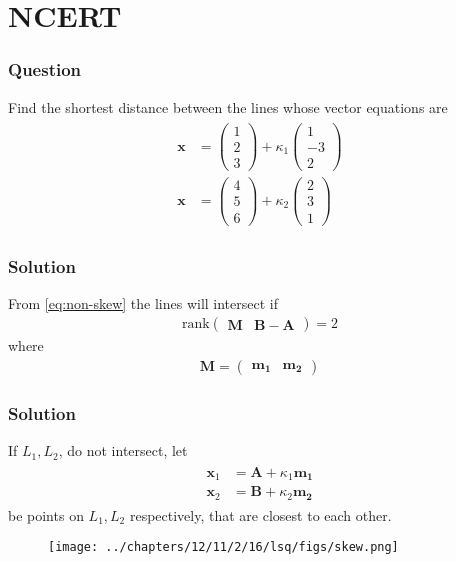 \documentclass{beamer}
\providecommand{\rank}{\text{rank}}
\theoremstyle{remark}
\newcommand{\myvec}[1]{\ensuremath{\begin{pmatrix}#1\end{pmatrix}}}
\let\vec\mathbf
\begin{document}
\section{NCERT}
\begin{frame}
\frametitle{Question}
Find the shortest distance between the lines whose vector equations are
    \begin{align}
\begin{split}
	\vec{x} &= \myvec{1\\2\\3} + \kappa_1\myvec{1\\-3\\2}
	\\
	\vec{x} &= \myvec{4\\5\\6} + \kappa_2\myvec{2\\3\\1}
\end{split}
        \label{eq:chapters/12/11/2/16/L2/svd}
    \end{align}
%		
\end{frame}
\begin{frame}
\frametitle{Solution}
	From \eqref{eq:non-skew}
the lines
will intersect if 
\begin{align}
	\rank\myvec{\vec{M}  &
	 \vec{B}-\vec{A}} = 2 
	    \label{eq:chapters/12/11/2/16/lsq/rank}
\end{align}
where
\begin{align}
	\vec{M} = 
	\myvec{\vec{m_1} & \vec{m_2}} 
\end{align}
\end{frame}
\begin{frame}
\frametitle{Solution}
If $L_1, L_2$, do not intersect, let 
\begin{align}
\begin{split}
	\vec{x}_1 &=\vec{A}+ \kappa_1\vec{m_1}
	\\
	\vec{x}_2 &= \vec{B}  + \kappa_2\vec{m_2} 
\end{split}
	    \label{eq:chapters/12/11/2/16/lsq/x1x2}
\end{align}
be points on 
$L_1, L_2$ respectively, that are closest to each other.
    \begin{figure}[H]
        \centering
        \texttt{[image: ../chapters/12/11/2/16/lsq/figs/skew.png]}
        \caption{}
    \end{figure}
\end{frame}
\end{document}
